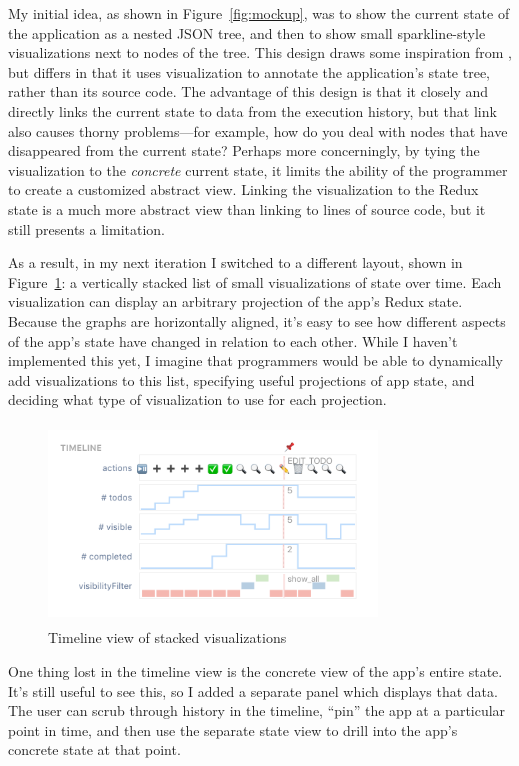\documentclass{sigchi}
\begin{document}
My initial idea, as shown in Figure~\ref{fig:mockup}, was to show the
current state of the application as a nested JSON tree, and then to show
small sparkline-style visualizations next to nodes of the tree. This
design draws some inspiration from \autocite{hoffswell2018a}, but
differs in that it uses visualization to annotate the application's
state tree, rather than its source code. The advantage of this design is
that it closely and directly links the current state to data from the
execution history, but that link also causes thorny problems---for
example, how do you deal with nodes that have disappeared from the
current state? Perhaps more concerningly, by tying the visualization to
the \emph{concrete} current state, it limits the ability of the
programmer to create a customized abstract view. Linking the
visualization to the Redux state is a much more abstract view than
linking to lines of source code, but it still presents a limitation.

As a result, in my next iteration I switched to a different layout,
shown in Figure~\ref{fig:timeline}: a vertically stacked list of small
visualizations of state over time. Each visualization can display an
arbitrary projection of the app's Redux state. Because the graphs are
horizontally aligned, it's easy to see how different aspects of the
app's state have changed in relation to each other. While I haven't
implemented this yet, I imagine that programmers would be able to
dynamically add visualizations to this list, specifying useful
projections of app state, and deciding what type of visualization to use
for each projection.

\begin{figure}
\hypertarget{fig:timeline}{%
\centering
\includegraphics[width=3.4375in,height=2.08333in]{images/timeline.png}
\caption{Timeline view of stacked visualizations}\label{fig:timeline}
}
\end{figure}

One thing lost in the timeline view is the concrete view of the app's
entire state. It's still useful to see this, so I added a separate panel
which displays that data. The user can scrub through history in the
timeline, ``pin'' the app at a particular point in time, and then use
the separate state view to drill into the app's concrete state at that
point.
\end{document}
